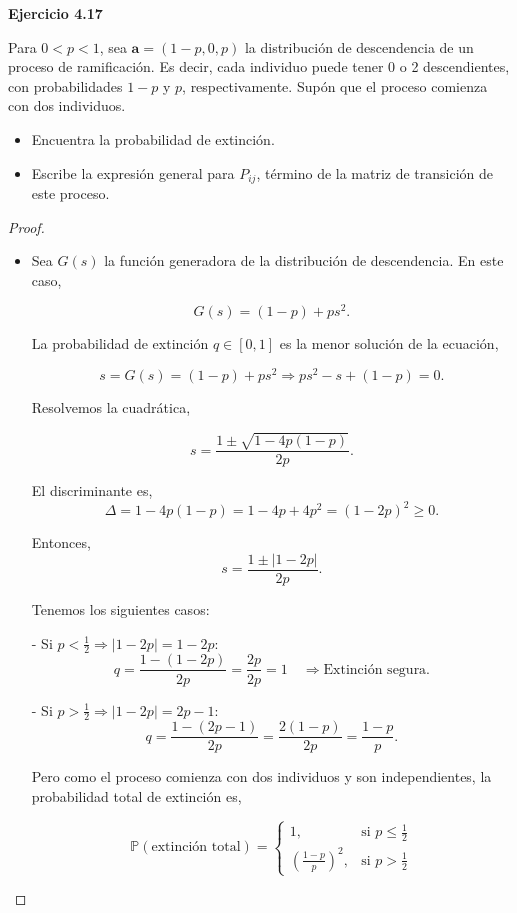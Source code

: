 \documentclass{article}
\begin{document}
\textbf{Ejercicio 4.17}

Para \( 0 < p < 1 \), sea \( \mathbf{a} = (1 - p, 0, p) \) la distribución de descendencia de un proceso de ramificación. Es decir, cada individuo puede tener 0 o 2 descendientes, con probabilidades \( 1 - p \) y \( p \), respectivamente. Supón que el proceso comienza con dos individuos.

\begin{itemize}
    \item[(a)] Encuentra la probabilidad de extinción.
    \item[(b)] Escribe la expresión general para \( P_{ij} \), término de la matriz de transición de este proceso.
\end{itemize}

\begin{proof}

\begin{itemize}
\item[(a)]
Sea \( G(s) \) la función generadora de la distribución de descendencia. En este caso,

\[
G(s) = (1 - p) + p s^2.
\]

La probabilidad de extinción \( q \in [0,1] \) es la menor solución de la ecuación,

\[
s = G(s) = (1 - p) + p s^2
\Rightarrow p s^2 - s + (1 - p) = 0.
\]

Resolvemos la cuadrática,

\[
s = \frac{1 \pm \sqrt{1 - 4p(1 - p)}}{2p}.
\]

El discriminante es,
\[
\Delta = 1 - 4p(1 - p) = 1 - 4p + 4p^2 = (1 - 2p)^2 \geq 0.
\]

Entonces,
\[
s = \frac{1 \pm |1 - 2p|}{2p}.
\]

Tenemos los siguientes casos:

- Si \( p < \frac{1}{2} \Rightarrow |1 - 2p| = 1 - 2p \):
\[
q = \frac{1 - (1 - 2p)}{2p} = \frac{2p}{2p} = 1
\quad \Rightarrow \text{Extinción segura.}
\]

- Si \( p > \frac{1}{2} \Rightarrow |1 - 2p| = 2p - 1 \):
\[
q = \frac{1 - (2p - 1)}{2p} = \frac{2(1 - p)}{2p} = \frac{1 - p}{p}.
\]

Pero como el proceso comienza con dos individuos y son independientes, la probabilidad total de extinción es,

\[
\mathbb{P}(\text{extinción total}) =
\begin{cases}
1, & \text{si } p \leq \frac{1}{2} \\
\left( \frac{1 - p}{p} \right)^2, & \text{si } p > \frac{1}{2}
\end{cases}
\]


\end{itemize}
\end{proof}
\end{document}
